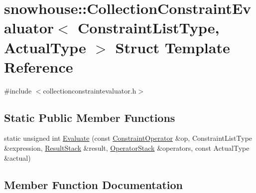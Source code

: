 \hypertarget{structsnowhouse_1_1CollectionConstraintEvaluator}{}\section{snowhouse\+::Collection\+Constraint\+Evaluator$<$ Constraint\+List\+Type, Actual\+Type $>$ Struct Template Reference}
\label{structsnowhouse_1_1CollectionConstraintEvaluator}


{\ttfamily \#include $<$collectionconstraintevaluator.\+h$>$}

\subsection*{Static Public Member Functions}
\begin{DoxyCompactItemize}
\item 
static unsigned int \mbox{\hyperlink{structsnowhouse_1_1CollectionConstraintEvaluator_a246cfc195e1501343833b023af183e7a}{Evaluate}} (const \mbox{\hyperlink{structsnowhouse_1_1ConstraintOperator}{Constraint\+Operator}} \&op, Constraint\+List\+Type \&expression, \mbox{\hyperlink{namespacesnowhouse_a719169b1315a13161c15f25e600a8f51}{Result\+Stack}} \&result, \mbox{\hyperlink{namespacesnowhouse_adcb10e215e6a4bbcb35722a9c7270fc6}{Operator\+Stack}} \&operators, const Actual\+Type \&actual)
\end{DoxyCompactItemize}


\subsection{Member Function Documentation}
\mbox{\label{structsnowhouse_1_1CollectionConstraintEvaluator_a246cfc195e1501343833b023af183e7a}} 
